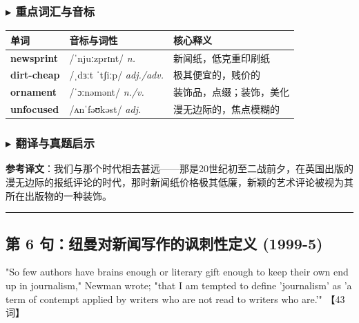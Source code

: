 \documentclass[cn,normal,11pt]{elegantnote}
\newcommand{\retrokey}[1]{{\color{accentcolor}\textbf{#1}}}
\renewcommand{\citshape}{\kaishu\fontspec{Arial}}
\begin{document}
\subsubsection*{$\blacktriangleright$ 重点词汇与音标}
\noindent
\begin{tabularx}{\textwidth}{l X p{7cm}}
  \toprule
  \textbf{单词} & \textbf{音标与词性} & \textbf{核心释义} \\
  \midrule
  \retrokey{newsprint} & {\citshape /ˈnjuːzprɪnt/} \textit{n.} & 新闻纸，低克重印刷纸 \\
  \midrule
  \retrokey{dirt-cheap} & {\citshape /ˌdɜːt ˈtʃiːp/} \textit{adj./adv.} & 极其便宜的，贱价的 \\
  \midrule
  \retrokey{ornament} & {\citshape /ˈɔːnəmənt/} \textit{n./v.} & 装饰品，点缀；装饰，美化 \\
  \midrule
  \retrokey{unfocused} & {\citshape /ʌnˈfəʊkəst/} \textit{adj.} & 漫无边际的，焦点模糊的 \\
  \bottomrule
\end{tabularx}

\subsubsection*{$\blacktriangleright$ 翻译与真题启示}
\begin{remark}
  \textbf{参考译文}：我们与那个时代相去甚远——那是20世纪初至二战前夕，在英国出版的漫无边际的报纸评论的时代，那时新闻纸价格极其低廉，新颖的艺术评论被视为其所在出版物的一种装饰。
\end{remark}

\par\vspace{10pt}\hrule\vspace{10pt}

\subsection{第 6 句：纽曼对新闻写作的讽刺性定义 (1999-5)}

\begin{note}
  "So few authors have brains enough or literary gift enough to keep their own end up in journalism," Newman wrote; "that I am tempted to define 'journalism' as 'a term of contempt applied by writers who are not read to writers who are.'" 【43 词】
\end{note}
\end{document}
